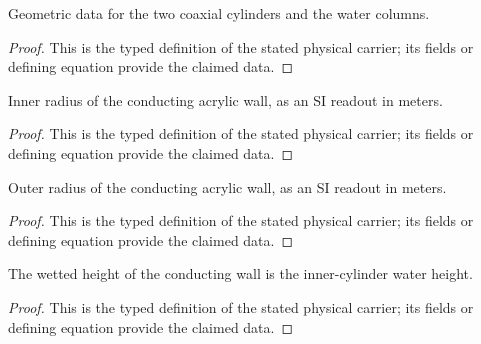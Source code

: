\begin{definition}
  \label{def:physics:IPhO_2026_4_C_7:aux011}
  Geometric data for the two coaxial cylinders and the water columns.
\end{definition}
\begin{proof}
  This is the typed definition of the stated physical carrier; its fields or defining equation provide the claimed data.
\end{proof}

\begin{definition}
  \label{def:physics:IPhO_2026_4_C_7:aux012}
  Inner radius of the conducting acrylic wall, as an SI readout in meters.
\end{definition}
\begin{proof}
  This is the typed definition of the stated physical carrier; its fields or defining equation provide the claimed data.
\end{proof}

\begin{definition}
  \label{def:physics:IPhO_2026_4_C_7:aux013}
  Outer radius of the conducting acrylic wall, as an SI readout in meters.
\end{definition}
\begin{proof}
  This is the typed definition of the stated physical carrier; its fields or defining equation provide the claimed data.
\end{proof}

\begin{definition}
  \label{def:physics:IPhO_2026_4_C_7:aux014}
  The wetted height of the conducting wall is the inner-cylinder water height.
\end{definition}
\begin{proof}
  This is the typed definition of the stated physical carrier; its fields or defining equation provide the claimed data.
\end{proof}

